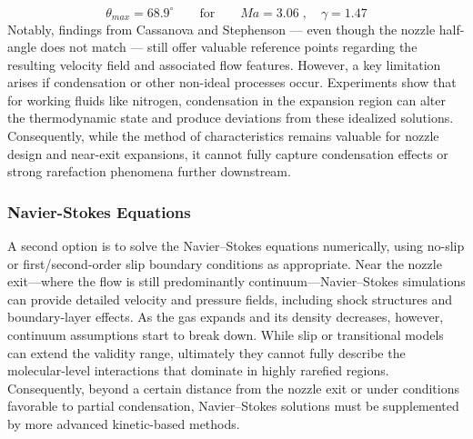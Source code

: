 		$$
			\theta_{max} = 68.9^\circ
			\qquad \text{for} \qquad
			Ma = 3.06\;,\quad \gamma = 1.47
		$$
		Notably, findings from Cassanova and Stephenson \cite{Cassanova1965} — even though the nozzle half-angle does not match — still offer valuable reference points regarding the resulting velocity field and associated flow features.
		However, a key limitation arises if condensation or other non-ideal processes occur.
		Experiments show that for working fluids like nitrogen, condensation in the expansion region can alter the thermodynamic state and produce deviations from these idealized solutions.
		Consequently, while the method of characteristics remains valuable for nozzle design and near-exit expansions, it cannot fully capture condensation effects or strong rarefaction phenomena further downstream.
		\cite{jousten_handbook_2016, robertson_investigation_1970, noauthor_zucrow_nodate}

\subsubsection*{Navier-Stokes Equations}
	A second option is to solve the Navier–Stokes equations numerically, using no-slip or first/second-order slip boundary conditions as appropriate.
	Near the nozzle exit—where the flow is still predominantly continuum—Navier–Stokes simulations can provide detailed velocity and pressure fields, including shock structures and boundary-layer effects.
	As the gas expands and its density decreases, however, continuum assumptions start to break down.
	While slip or transitional models can extend the validity range, ultimately they cannot fully describe the molecular-level interactions that dominate in highly rarefied regions.
	Consequently, beyond a certain distance from the nozzle exit or under conditions favorable to partial condensation, Navier–Stokes solutions must be supplemented by more advanced kinetic-based methods.
	\cite{anderson_fundamentals_2017, anderson2021modern}

